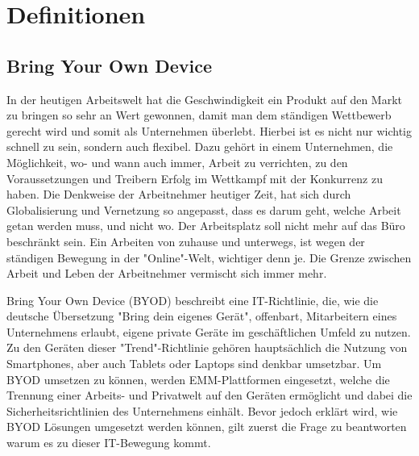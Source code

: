 \chapter{Definitionen}
\label{cha:Definitionen}

\section{Bring Your Own Device}
In der heutigen Arbeitswelt hat die Geschwindigkeit ein Produkt auf den Markt zu bringen so sehr an Wert gewonnen, damit man dem ständigen Wettbewerb gerecht wird und somit als Unternehmen überlebt. Hierbei ist es nicht nur wichtig schnell zu sein, sondern auch flexibel. Dazu gehört in einem Unternehmen, die Möglichkeit, wo- und wann auch immer, Arbeit zu verrichten, zu den Voraussetzungen und Treibern Erfolg im Wettkampf mit der Konkurrenz zu haben. Die Denkweise der Arbeitnehmer heutiger Zeit, hat sich durch Globalisierung und Vernetzung so angepasst, dass es darum geht, welche Arbeit getan werden muss, und nicht wo. Der Arbeitsplatz soll nicht mehr auf das Büro beschränkt sein. Ein Arbeiten von zuhause und unterwegs, ist wegen der ständigen Bewegung in der "Online"-Welt, wichtiger denn je. Die Grenze zwischen Arbeit und Leben der Arbeitnehmer vermischt sich immer mehr.

Bring Your Own Device (BYOD) beschreibt eine IT-Richtlinie, die, wie die deutsche Übersetzung "Bring dein eigenes Gerät", offenbart, Mitarbeitern eines Unternehmens erlaubt, eigene private Geräte im geschäftlichen Umfeld zu nutzen. Zu den Geräten dieser "Trend"-Richtlinie gehören hauptsächlich die Nutzung von Smartphones, aber auch Tablets oder Laptops sind denkbar umsetzbar. Um BYOD umsetzen zu können, werden EMM-Plattformen eingesetzt, welche die Trennung einer Arbeits- und Privatwelt auf den Geräten ermöglicht und dabei die Sicherheitsrichtlinien des Unternehmens einhält. Bevor jedoch erklärt wird, wie BYOD Lösungen umgesetzt werden können, gilt zuerst die Frage zu beantworten warum es zu dieser IT-Bewegung kommt.

